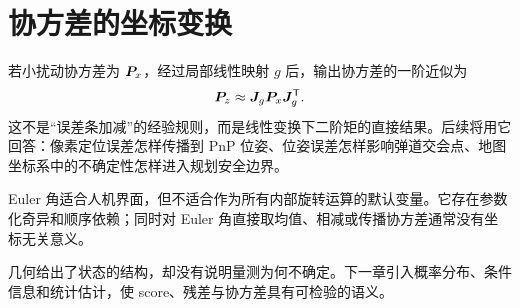 \section{协方差的坐标变换}

若小扰动协方差为 $\bm{P}_x$，经过局部线性映射 $g$ 后，输出协方差的一阶近似为
\begin{equation}
  \bm{P}_z\approx \bm{J}_g\bm{P}_x\bm{J}_g^{\mathsf T}.
\end{equation}
这不是“误差条加减”的经验规则，而是线性变换下二阶矩的直接结果。后续将用它回答：像素定位误差怎样传播到 PnP 位姿、位姿误差怎样影响弹道交会点、地图坐标系中的不确定性怎样进入规划安全边界。

\begin{failuremode}
Euler 角适合人机界面，但不适合作为所有内部旋转运算的默认变量。它存在参数化奇异和顺序依赖；同时对 Euler 角直接取均值、相减或传播协方差通常没有坐标无关意义。
\end{failuremode}

\begin{chaptertransition}
几何给出了状态的结构，却没有说明量测为何不确定。下一章引入概率分布、条件信息和统计估计，使 score、残差与协方差具有可检验的语义。
\end{chaptertransition}

